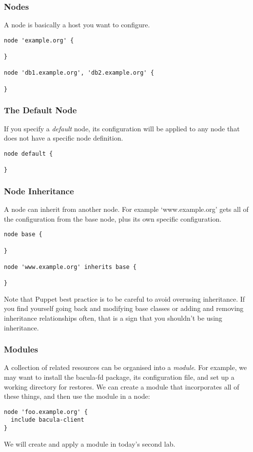 \documentclass[10pt]{beamer}
\begin{document}
\begin{frame}[fragile]
  \frametitle{Nodes}

A node is basically a host you want to configure.
\begin{verbatim}
node 'example.org' {

}

node 'db1.example.org', 'db2.example.org' {

}
\end{verbatim}


\end{frame}

\begin{frame}[fragile]
  \frametitle{The Default Node}

If you specify a \emph{default} node, its configuration will be applied to any node that does not have a specific node definition.
\begin{verbatim}
node default {

}
\end{verbatim}


\end{frame}

\begin{frame}[fragile]
  \frametitle{Node Inheritance}

A node can inherit from another node.  For example `www.example.org' gets all of the configuration from the base node, plus its own specific configuration.

\begin{verbatim}
node base {

}

node 'www.example.org' inherits base {

}
\end{verbatim}

Note that Puppet best practice is to be careful to avoid overusing inheritance.  If you find yourself going back and modifying base classes or adding and removing inheritance relationships often, that is a sign that you shouldn't be using inheritance.

\end{frame}

\begin{frame}[fragile]
  \frametitle{Modules}
  A collection of related resources can be organised into a \emph{module}.  For example, we may want to install the bacula-fd package, its configuration file, and set up a working directory for restores.  We can create a module that incorporates all of these things, and then use the module in a node:

\begin{verbatim}
node 'foo.example.org' {
  include bacula-client
}
\end{verbatim}

We will create and apply a module in today's second lab.



\end{frame}
\end{document}
